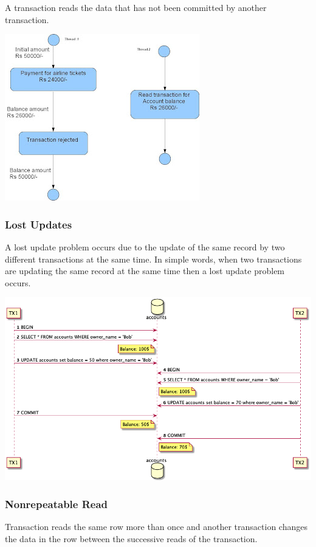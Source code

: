 A transaction reads the data that has not been committed by another transaction.

\includegraphics{./images/chapter-tx/DirtyRead.JPG}

\subsubsection{Lost Updates}

A lost update problem occurs due to the update of the same record by two different transactions at the same time. In simple words, when two transactions are updating the same record at the same time then a lost update problem occurs.

\includegraphics[width=\textwidth]{./images/chapter-tx/lost_update.png}

\subsubsection{Nonrepeatable Read}

Transaction reads the same row more than once and another transaction changes the data in the row between the successive reads of the transaction.

